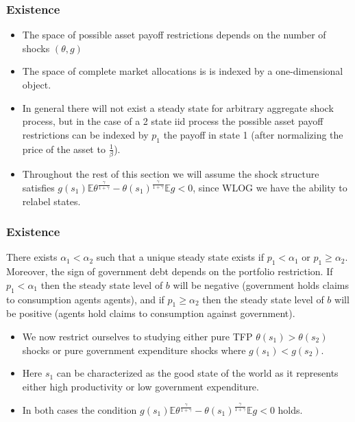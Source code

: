 \documentclass{beamer}
\newcommand{\EE}{\mathbb E}
\begin{document}
\begin{frame}
 \frametitle{Existence }
 \begin{itemize}
	\item The space of possible asset payoff restrictions depends on the number of shocks $(\theta,g)$
	\item The space of complete market allocations is is indexed by a one-dimensional object.
	\item  In general there will not exist a steady state for arbitrary aggregate shock process, but in the case of a 2 state iid process the possible asset payoff restrictions can be indexed by $p_1$ the payoff in state 1 (after normalizing the price of the asset to $\frac1\beta$).
	\item  Throughout the rest of this section we will assume the shock structure satisfies $g(s_1)\EE\theta^\frac{\gamma}{1+\gamma}-\theta(s_1)^\frac\gamma{1+\gamma}\EE g < 0$, since WLOG we have the ability to relabel states.
\end{itemize}
\end{frame}

\begin{frame}
	\frametitle{Existence}
	\begin{lemma}There exists $\alpha_1<\alpha_2$ such that a unique steady state exists if $p_1 < \alpha_1$  or $p_1 \geq \alpha_2$.  Moreover, the sign of government debt depends on the portfolio restriction.  If $p_{1} < \alpha_1$ then the steady state level of $b$ will be negative (government holds claims to consumption agents agents), and if $p_{1} \geq \alpha_2$ then the steady state level of $b$ will be positive (agents hold claims to consumption against government).  
\end{lemma}
\begin{itemize}
	\item We now restrict ourselves to studying either pure TFP $\theta(s_1) >\theta(s_2)$ shocks or pure government expenditure shocks where $g(s_1) < g(s_2)$. 
	\item  Here $s_1$ can be characterized as the good state of the world as it represents either high productivity or low government expenditure.
	\item  In both cases the condition  $g(s_1)\EE\theta^\frac{\gamma}{1+\gamma}-\theta(s_1)^\frac\gamma{1+\gamma}\EE g < 0$ holds.
\end{itemize}
\end{frame}
\end{document}
